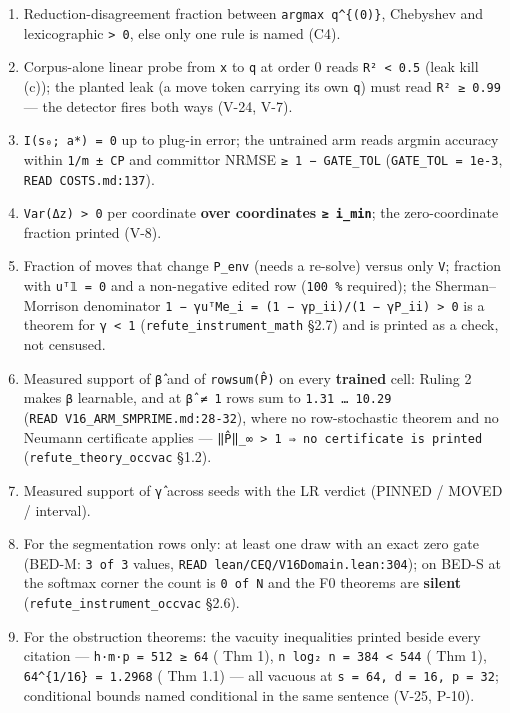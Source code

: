 \documentclass[11pt,a4paper]{article}
\theoremstyle{plain}
\theoremstyle{definition}
\theoremstyle{remark}
\begin{document}
\begin{enumerate}
  inverted gate --- \texttt{refute\_instrument\_occvac} §2.4); ties
  within \texttt{1e-9} discarded and the discard count printed.
\item
  Reduction-disagreement fraction between \texttt{argmax\ q\^{}\{(0)\}},
  Chebyshev and lexicographic \texttt{\textgreater{}\ 0}, else only one
  rule is named (C4).
\item
  Corpus-alone linear probe from \texttt{x} to \texttt{q} at order 0
  reads \texttt{R²\ \textless{}\ 0.5} (leak kill (c)); the planted leak
  (a move token carrying its own \texttt{q}) must read
  \texttt{R²\ ≥\ 0.99} --- the detector fires both ways (V-24, V-7).
\item
  \texttt{I(s₀;\ a*)\ =\ 0} up to plug-in error; the untrained arm reads
  argmin accuracy within \texttt{1/m\ ±\ CP} and committor NRMSE
  \texttt{≥\ 1\ −\ GATE\_TOL} (\texttt{GATE\_TOL\ =\ 1e-3},
  \texttt{READ\ COSTS.md:137}).
\item
  \texttt{Var(Δz)\ \textgreater{}\ 0} per coordinate \textbf{over
  coordinates \texttt{≥\ i\_min}}; the zero-coordinate fraction printed
  (V-8).
\item
  Fraction of moves that change \texttt{P\_env} (needs a re-solve)
  versus only \texttt{V}; fraction with \texttt{uᵀ𝟙\ =\ 0} and a
  non-negative edited row (\texttt{100\ \%} required); the
  Sherman--Morrison denominator
  \texttt{1\ −\ γuᵀMe\_i\ =\ (1\ −\ γp\textquotesingle{}\_ii)/(1\ −\ γP\_ii)\ \textgreater{}\ 0}
  is a theorem for \texttt{γ\ \textless{}\ 1}
  (\texttt{refute\_instrument\_math} §2.7) and is printed as a check,
  not censused.
\item
  Measured support of \texttt{β̂} and of \texttt{rowsum(P̂)} on every
  \textbf{trained} cell: Ruling 2 makes \texttt{β} learnable, and at
  \texttt{β̂\ ≠\ 1} rows sum to \texttt{1.31\ …\ 10.29}
  (\texttt{READ\ V16\_ARM\_SMPRIME.md:28-32}), where no row-stochastic
  theorem and no Neumann certificate applies ---
  \texttt{‖P̂‖\_∞\ \textgreater{}\ 1\ ⇒\ no\ certificate\ is\ printed}
  (\texttt{refute\_theory\_occvac} §1.2).
\item
  Measured support of \texttt{γ̂} across seeds with the LR verdict
  (PINNED / MOVED / interval).
\item
  For the segmentation rows only: at least one draw with an exact zero
  gate (BED-M: \texttt{3\ of\ 3} values,
  \texttt{READ\ lean/CEQ/V16Domain.lean:304}); on BED-S at the softmax
  corner the count is \texttt{0\ of\ N} and the F0 theorems are
  \textbf{silent} (\texttt{refute\_instrument\_occvac} §2.6).
\item
  For the obstruction theorems: the vacuity inequalities printed beside
  every citation --- \texttt{h·m·p\ =\ 512\ ≥\ 64}
  (\citep{sanford-2024-inductionheads} Thm 1),
  \texttt{n\ log₂\ n\ =\ 384\ \textless{}\ 544}
  (\citep{peng-2024-transformer-limitations} Thm 1),
  \texttt{64\^{}\{1/16\}\ =\ 1.2968} (\citep{chen-2024-multilayer} Thm
  1.1) --- all vacuous at \texttt{s\ =\ 64,\ d\ =\ 16,\ p\ =\ 32};
  conditional bounds named conditional in the same sentence (V-25,
  P-10).
\end{enumerate}
\end{document}
